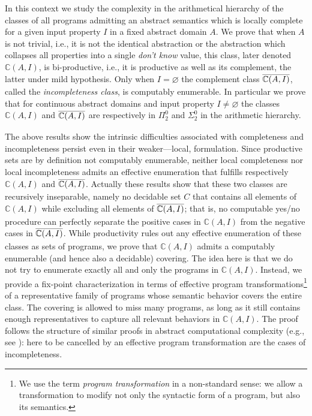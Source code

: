 \documentclass[runningheads]{llncs}
\def\ok#1{\mbox{\raisebox{0ex}[1ex][1ex]{$#1$}}}
\def\bbbc{{\mathbb{C}}}
\newcommand{\compl}[1]{\ok{\overline{#1}}}
\def\ok#1{\mbox{\raisebox{0ex}[1ex][1ex]{$#1$}}}
\def\cAA{\ensuremath{A}}
\begin{document}
\smallskip

In this context we study the complexity in the arithmetical hierarchy of the classes of all programs admitting an abstract semantics which is locally complete for a given input property $I$ in a fixed abstract domain $\cAA$. We prove that when $\cAA$ is not trivial, i.e., it is not the identical abstraction or the abstraction which collapses all properties into a single {\em don’t know} value,
this class, later denoted $\bbbc(\cAA,I)$, is bi-productive, i.e., it is productive as well as its complement, the latter under mild hypothesis. Only when $I=\varnothing$ the complement class $\compl{\bbbc(\cAA,I)}$, called the {\em incompleteness class}, is computably enumerable. In particular we prove that for continuous abstract domains and input property $I\neq\varnothing$ the classes $\bbbc(\cAA,I)$ and $\compl{\bbbc(\cAA,I)}$ are respectively in $\Pi^0_2$ and $\Sigma^0_2$ in the arithmetic hierarchy. 

\smallskip

The above results show the intrinsic difficulties associated with completeness and incompleteness persist even in their weaker---local, formulation. Since productive sets are by definition not computably enumerable, neither local completeness nor local incompleteness admits an effective enumeration that fulfills respectively $\bbbc(\cAA,I)$ and $\compl{\bbbc(\cAA,I)}$. Actually these results show that these two classes are recursively inseparable, namely no decidable set $C$ that contains all elements of $\bbbc(\cAA,I)$ while excluding all elements of $\compl{\bbbc(\cAA,I)}$; that is, no computable yes/no procedure can perfectly separate the positive cases in $\bbbc(\cAA,I)$ from the negative cases in $\compl{\bbbc(\cAA,I)}$.
While productivity rules out any effective enumeration of these classes as sets of programs, we prove that $\bbbc(\cAA,I)$ admits a computably enumerable (and hence also a decidable) covering. The idea here is that we do not try to enumerate exactly all and only the programs in $\bbbc(\cAA,I)$. Instead, we provide a fix-point characterization in terms of effective program transformations\footnote{We use the term {\em program transformation\/} in a non-standard sense: we allow a transformation to modify not only the syntactic form of a program, but also its semantics.} of a representative family of programs whose semantic behavior covers the entire class. The covering is allowed to miss many programs, as long as it still contains enough representatives to capture all relevant behaviors in $\bbbc(\cAA,I)$. The proof follows the structure of similar proofs in abstract computational complexity (e.g., see \cite{Blum67}): here to be cancelled by an effective program transformation are the cases of incompleteness.
\end{document}
